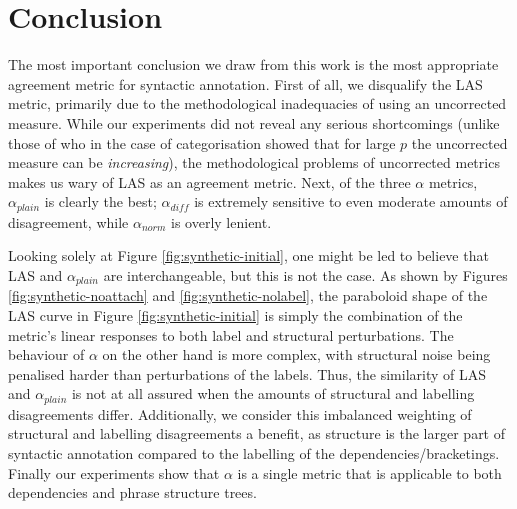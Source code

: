 \documentclass[11pt]{article}
\makeatletter
\def\noparencite#1#2{{#1\if@tempswa , #2\fi}}
\newcommand\citeNP[1]{{\let\@cite=\noparencite\cite{#1}}}
\makeatother
\begin{document}
\section{Conclusion}
The most important conclusion we draw from this work is the most appropriate
agreement metric for syntactic annotation. First of all, we disqualify the LAS
metric, primarily due to the methodological inadequacies of using an
uncorrected measure. While our experiments did not reveal any serious
shortcomings (unlike those of \citeNP{Mathet:etal12} who in the case of
categorisation showed that for large $p$ the uncorrected measure can be
\emph{increasing}), the methodological problems of uncorrected metrics makes
us wary of LAS as an agreement metric. Next, of the three $\alpha$ metrics,
$\alpha_{plain}$ is clearly the best; $\alpha_{diff}$ is extremely sensitive
to even moderate amounts of disagreement, while $\alpha_{norm}$ is overly
lenient.

Looking solely at Figure \ref{fig:synthetic-initial}, one might be led to
believe that LAS and $\alpha_{plain}$ are interchangeable, but this is not the
case. As shown by Figures \ref{fig:synthetic-noattach} and
\ref{fig:synthetic-nolabel}, the paraboloid shape of the LAS curve in Figure
\ref{fig:synthetic-initial} is simply the combination of the metric's linear
responses to both label and structural perturbations. The behaviour of
$\alpha$ on the other hand is more complex, with structural noise being
penalised harder than perturbations of the labels. Thus, the similarity of LAS
and $\alpha_{plain}$ is not at all assured when the amounts of structural and
labelling disagreements differ. Additionally, we consider this imbalanced
weighting of structural and labelling disagreements a benefit, as structure is
the larger part of syntactic annotation compared to the labelling of the
dependencies/bracketings. Finally our experiments show that $\alpha$ is a
single metric that is applicable to both dependencies and phrase structure
trees.
\end{document}
